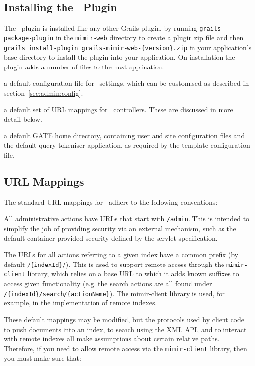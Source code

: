 \subsection{Installing the \Mimir\ Plugin}

The \Mimir\ plugin is installed like any other Grails plugin, by running
{\tt grails package-plugin} in the {\tt mimir-web} directory to
create a plugin zip file and then
{\tt grails install-plugin grails-mimir-web-\{version\}.zip} in your
application's base directory to install the plugin into your application.  On
installation the plugin adds a number of files to the host application:

\bde
\item[grails-app/conf/MimirConfig.groovy] a default configuration file for
  \Mimir\ settings, which can be customised as described in
  section~\ref{sec:admin:config}.
\item[grails-app/conf/MimirUrlMappings.groovy] a default set of URL mappings
  for \Mimir\ controllers.  These are discussed in more detail below.
\item[web-app/WEB-INF/gate-home] a default GATE home directory, containing user
  and site configuration files and the default query tokeniser application, as
  required by the template configuration file.
\ede

\subsection{URL Mappings}

The standard URL mappings for \Mimir\ adhere to the following conventions:
\bit
  \item All administrative actions have URLs that start with {\tt /admin}. This
  is intended to simplify the job of providing security via an external
  mechanism, such as the default container-provided security defined by the
  servlet specification.
  \item The URLs for all actions referring to a given index have a common prefix
  (by default {\tt /\{indexId\}/}). This is used to support remote access
  through the {\tt mimir-client} library, which relies on a base URL to which it
  adds known suffixes to access given functionality (e.g. the search actions
  are all found under {\tt /\{indexId\}/search/\{actionName\}}). The
  mimir-client library is used, for example, in the implementation of remote
  indexes.
\eit

These default mappings may be modified, but the protocols used by client
code to push documents into an index, to search using the XML API, and to
interact with remote indexes all make assumptions about certain relative paths.
Therefore, if you need to allow remote access via the {\tt mimir-client}
library, then you must make sure that:

